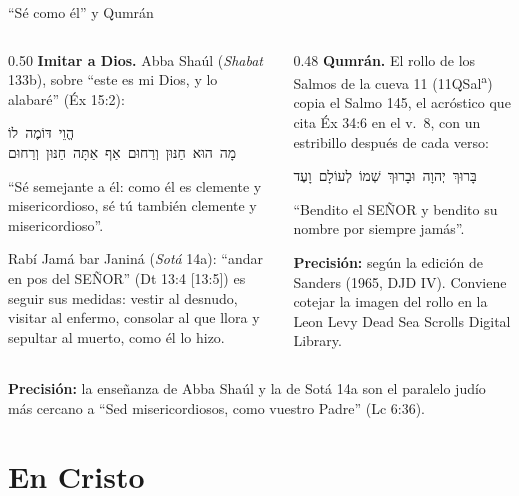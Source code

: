\documentclass[hyperref={bookmarks=false},aspectratio=169]{beamer}
\newcommand{\heb}[1]{\mbox{\foreignlanguage{hebrew}{#1}}}
\newcommand{\SENOR}{S{\fontsize{0.78em}{1em}\selectfont EÑOR}}
\newcommand{\precision}[1]{{\footnotesize\color{gris}\textbf{Precisión:} #1}}
\begin{document}
\begin{frame}{``Sé como él'' y Qumrán}
\begin{columns}[t,onlytextwidth]
\begin{column}{0.50\textwidth}\small
\textbf{Imitar a Dios.} Abba Shaúl (\emph{Shabat} 133b), sobre ``este es mi Dios, y lo alabaré'' (Éx 15:2):
\begin{center}\heb{הֱוֵי דּוֹמֶה לוֹ}\\ \heb{מָה הוּא חַנּוּן וְרַחוּם אַף אַתָּה חַנּוּן וְרַחוּם}\end{center}
``Sé semejante a él: como él es clemente y misericordioso, sé tú también clemente y misericordioso''.\par\smallskip
\scriptsize Rabí Jamá bar Janiná (\emph{Sotá} 14a): ``andar en pos del \SENOR'' (Dt 13:4 [13:5]) es seguir sus medidas: vestir al desnudo, visitar al enfermo, consolar al que llora y sepultar al muerto, como él lo hizo.
\end{column}
\begin{column}{0.48\textwidth}\small
\textbf{Qumrán.} El rollo de los Salmos de la cueva 11 (11QSal\textsuperscript{a}) copia el Salmo 145, el acróstico que cita Éx 34:6 en el v.~8, con un estribillo después de cada verso:
\begin{center}\heb{בָּרוּךְ יְהוָה וּבָרוּךְ שְׁמוֹ לְעוֹלָם וָעֶד}\end{center}
``Bendito el \SENOR{} y bendito su nombre por siempre jamás''.\par\smallskip
\precision{según la edición de Sanders (1965, DJD IV). Conviene cotejar la imagen del rollo en la Leon Levy Dead Sea Scrolls Digital Library.}
\end{column}
\end{columns}\par\smallskip
\precision{la enseñanza de Abba Shaúl y la de Sotá 14a son el paralelo judío más cercano a ``Sed misericordiosos, como vuestro Padre'' (Lc 6:36).}
\end{frame}

\section{En Cristo}
\end{document}
